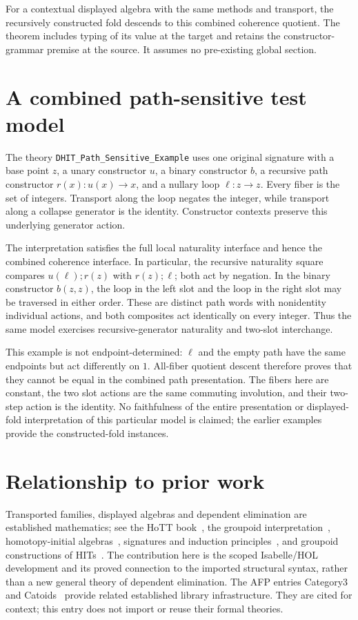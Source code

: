 \documentclass[11pt,a4paper]{article}
\begin{document}
For a contextual displayed algebra with the same methods and transport,
the recursively constructed fold descends to this combined coherence
quotient. The theorem includes typing of its value at the target and retains
the constructor-grammar premise at the source. It assumes no pre-existing
global section.

\section{A combined path-sensitive test model}

The theory \texttt{DHIT\_Path\_Sensitive\_Example} uses one original signature
with a base point \(z\), a unary constructor \(u\), a binary constructor \(b\),
a recursive path constructor \(r(x):u(x)\longrightarrow x\), and a nullary
loop \(\ell:z\longrightarrow z\). Every fiber is the set of integers.
Transport along the loop negates the integer, while transport along a collapse
generator is the identity. Constructor contexts preserve this underlying
generator action.

The interpretation satisfies the full local naturality interface and hence
the combined coherence interface. In particular, the recursive naturality
square compares \(u(\ell);r(z)\) with \(r(z);\ell\); both act by negation.
In the binary constructor \(b(z,z)\), the loop in the left slot and the loop
in the right slot may be traversed in either order. These are distinct path
words with nonidentity individual actions, and both composites act identically
on every integer. Thus the same model exercises recursive-generator
naturality and two-slot interchange.

This example is not endpoint-determined: \(\ell\) and the empty path have
the same endpoints but act differently on \(1\). All-fiber quotient descent
therefore proves that they cannot be equal in the combined path presentation.
The fibers here are constant, the two slot actions are the same commuting
involution, and their two-step action is the identity. No faithfulness of the
entire presentation or displayed-fold interpretation of this particular model
is claimed; the earlier examples provide the constructed-fold instances.

\section{Relationship to prior work}
Transported families, displayed algebras and dependent elimination are
established mathematics; see the HoTT book~\cite{HoTTBook2013}, the groupoid
interpretation~\cite{HofmannStreicher1998}, homotopy-initial
algebras~\cite{Sojakova2015}, signatures and induction
principles~\cite{KaposiKovacs2020}, and groupoid constructions of
HITs~\cite{DybjerMoeneclaey2018,VeltriVanDerWeide2021}. The contribution here is
the scoped Isabelle/HOL development and its proved connection to the imported
structural syntax, rather than a new general theory of dependent elimination.
The AFP entries Category3~\cite{Category3AFP} and Catoids~\cite{CatoidsAFP}
provide related established library infrastructure. They are cited for
context; this entry does not import or reuse their formal theories.
\end{document}
